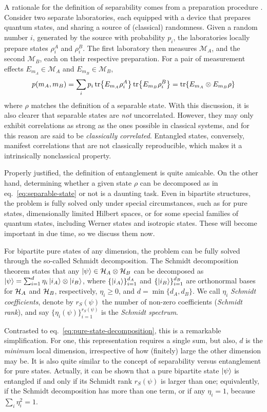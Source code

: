 		A rationale for the definition of separability comes from a preparation procedure \cite{werner_1989}. Consider two separate laboratories, each equipped with a device that prepares quantum states, and sharing a source of (classical) randomness. Given a random number $i$, generated by the source with probability $p_i$, the laboratories locally prepare states $\rho_i^A$ and $\rho_i^B$. The first laboratory then measures $\mathcal{M}_A$, and the second $\mathcal{M}_B$, each on their respective preparation. For a pair of measurement effects $E_{m_A} \in \mathcal{M}_A$ and $E_{m_B} \in \mathcal{M}_B$,
		$$
			p(m_A, m_B) = \sum_i p_i \tr{E_{m_A} \rho_i^A} \tr{E_{m_B} \rho_i^B} = \tr{ E_{m_A} \otimes E_{m_B} \rho}
		$$
		where $\rho$ matches the definition of a separable state. With this discussion, it is also clearer that separable states are \emph{not} uncorrelated. However, they may only exhibit correlations as strong as the ones possible in classical systems, and for this reason are said to be \emph{classically correlated}. Entangled states, conversely, manifest correlations that are not classically reproducible, which makes it a intrinsically nonclassical property.
	
		Properly justified, the definition of entanglement is quite amicable. On the other hand, determining whether a given state $\rho$ can be decomposed as in eq.~\eqref{eq:separable-state} or not is a daunting task. Even in bipartite structures, the problem is fully solved only under special circumstances, such as for pure states, dimensionally limited Hilbert spaces, or for some special families of quantum states, including Werner states and isotropic states. These will become important in due time, so we discuss them now.
	
		For bipartite pure states of any dimension, the problem can be fully solved through the so-called Schmidt decomposition. The Schmidt decomposition theorem states that any $\ket{\psi} \in \mathcal{H}_A \otimes \mathcal{H}_B$ can be decomposed as $\ket{\psi} = \sum_{i=1}^d \eta_i \ket{i_A} \otimes \ket{i_B}$, where $\{ \ket{i_A} \}_{i=1}^{d_A}$ and $\{ \ket{i_B} \}_{i=1}^{d_B}$ are orthonormal bases for $\mathcal{H}_A$ and $\mathcal{H}_B$, respectively, $\eta_i \geq 0$, and $d = \min \{d_A, d_B\}$. We call $\eta_i$ \emph{Schmidt coefficients}, denote by $r_S(\psi)$ the number of non-zero coefficients (\emph{Schmidt rank}), and say $\{ \eta_i (\psi) \}_{i=1}^{r_S(\psi)}$ is the \emph{Schmidt spectrum}.
	
		Contrasted to eq.~\eqref{eq:pure-state-decomposition}, this is a remarkable simplification. For one, this representation requires a single sum, but also, $d$ is the \emph{minimum} local dimension, irrespective of how (finitely) large the other dimension may be. It is also quite similar to the concept of separability versus entanglement for pure states. Actually, it can be shown that a pure bipartite state $\ket{\psi}$ is entangled if and only if its Schmidt rank $r_S(\psi)$ is larger than one; equivalently, if the Schmidt decomposition has more than one term, or if any $\eta_i = 1$, because $\sum_i \eta_i^2 = 1$.
	
